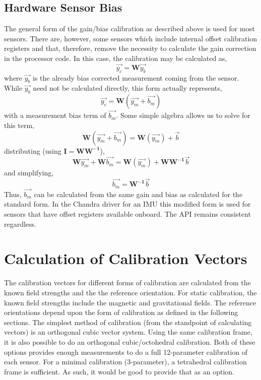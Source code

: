 \documentclass[10pt,letterpaper]{memoir} %
\begin{document}
\subsection{Hardware Sensor Bias}
The general form of the gain/bias calibration as described above is used for most sensors.  There are, however, some sensors which include internal offset calibration registers and that, therefore, remove the necessity to calculate the gain correction in the processor code.  In this case, the calibration may be calculated as,
\begin{equation}
	\vec{y_c} = \mathbf{W}\vec{y_b}
\end{equation} 
where $\vec{y_b}$ is the already bias corrected measurement coming from the sensor.  While $\vec{y_b}$ need not be calculated directly, this form actually represents,
\begin{equation}
	\vec{y_c} = \mathbf{W}(\vec{y_m}+\vec{b_m})
\end{equation}  
with a measurement bias term of $\vec{b_m}$.  Some simple algebra allows us to solve for this term,
\begin{equation}
	\mathbf{W}(\vec{y_m}+\vec{b_m}) = \mathbf{W}(\vec{y_m}) + \vec{b}
\end{equation}  
distributing (using $\mathbf{I} = \mathbf{W}\mathbf{W^{-1}}$),
\begin{equation}
	\mathbf{W}\vec{y_m}+\mathbf{W}\vec{b_m} = \mathbf{W}(\vec{y_m}) + \mathbf{W}\mathbf{W^{-1}}\vec{b}
\end{equation}
and simplifying,
\begin{equation}
	\vec{b_m} = \mathbf{W^{-1}}\vec{b}
\end{equation}
Thus, $\vec{b_m}$ can be calculated from the same gain and bias as calculated for the standard form.  In the Chandra driver for an IMU this modified form is used for sensors that have offset registers available onboard.  The API remains consistent regardless.

\section{Calculation of Calibration Vectors}
The calibration vectors for different forms of calibration are calculated from the known field strengths and the the reference orientation.  For static calibration, the known field strengths include the magnetic and gravitational fields.  The reference orientations depend upon the form of calibration as defined in the following sections.  The simplest method of calibration (from the standpoint of calculating vectors) is an orthogonal cubic vector system.  Using the same calibration frame, it is also possible to do an orthogonal cubic/octohedral calibration. Both of these options provides enough measurements to do a full 12-parameter calibration of each sensor.  For a minimal calibration (3-parameter), a tetrahedral calibration frame is sufficient.  As such, it would be good to provide that as an option.
\end{document}
